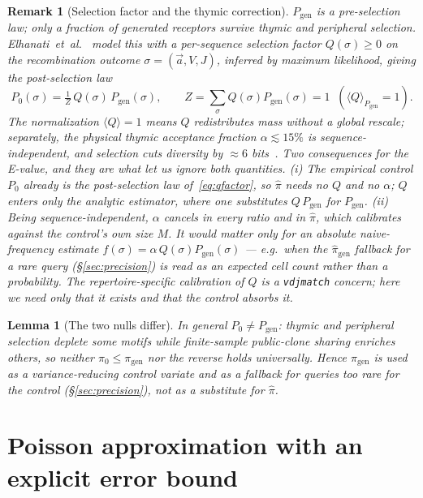 \documentclass[11pt]{article}
\theoremstyle{oldplain}
\newtheorem{lemma}{Lemma}
\theoremstyle{oldrem}
\newtheorem{remark}{Remark}
\newcommand{\Pgen}{P_{\mathrm{gen}}}
\newcommand{\Pzero}{P_{0}}
\begin{document}
\begin{remark}[Selection factor and the thymic correction]\label{rem:thymic}
$\Pgen$ is a \emph{pre-selection} law; only a fraction of generated receptors survive thymic and
peripheral selection. Elhanati~et~al.~\cite{Elhanati2014} model this with a per-sequence
\emph{selection factor} $Q(\sigma)\ge 0$ on the recombination outcome $\sigma=(\vec a,V,J)$, inferred
by maximum likelihood, giving the post-selection law
\begin{equation}\label{eq:qfactor}
  \Pzero(\sigma) = \tfrac1Z\,Q(\sigma)\,\Pgen(\sigma),\qquad
  Z=\sum_\sigma Q(\sigma)\Pgen(\sigma)=1 \;\;(\langle Q\rangle_{\Pgen}=1).
\end{equation}
The normalization $\langle Q\rangle=1$ means $Q$ \emph{redistributes} mass without a global rescale;
separately, the physical thymic acceptance fraction $\alpha\lesssim 15\%$ is sequence-independent, and
selection cuts diversity by $\approx6$ bits~\cite{Elhanati2014}. Two consequences for the E-value, and
they are what let us ignore both quantities. (i) The empirical control $\Pzero$ already \emph{is} the
post-selection law of~\eqref{eq:qfactor}, so $\hat\pi$ needs no $Q$ and no $\alpha$; $Q$ enters only
the analytic estimator, where one substitutes $Q\,\Pgen$ for $\Pgen$. (ii) Being
sequence-independent, $\alpha$ \emph{cancels} in every ratio and in $\hat\pi$, which calibrates against
the control's own size $M$. It would matter only for an \emph{absolute} naive-frequency estimate
$f(\sigma)=\alpha\,Q(\sigma)\Pgen(\sigma)$ --- e.g.\ when the $\hat\pi_{\mathrm{gen}}$ fallback for a
rare query (\S\ref{sec:precision}) is read as an expected cell count rather than a probability. The
repertoire-specific calibration of $Q$ is a \texttt{vdjmatch} concern; here we need only that it exists
and that the control absorbs it.
\end{remark}

\begin{lemma}[The two nulls differ]\label{lem:hierarchy}
In general $\Pzero \ne \Pgen$: thymic and peripheral selection deplete some motifs while
finite-sample public-clone sharing enriches others, so neither $\pi_0 \le \pi_{\mathrm{gen}}$ nor
the reverse holds universally. Hence $\hat\pi_{\mathrm{gen}}$ is used as a variance-reducing control
variate and as a fallback for queries too rare for the control (\S\ref{sec:precision}), not as a
substitute for $\hat\pi$.
\end{lemma}

\section{Poisson approximation with an explicit error bound}\label{sec:poisson}
\end{document}
